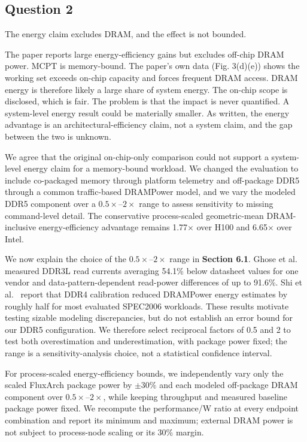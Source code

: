 \subsection{Question 2}
\begin{reviewcomment}
The energy claim excludes DRAM, and the effect is not bounded.

The paper reports large energy-efficiency gains but excludes off-chip DRAM power. MCPT is memory-bound. The paper's own data (Fig. 3(d)(e)) shows the working set exceeds on-chip capacity and forces frequent DRAM access. DRAM energy is therefore likely a large share of system energy. The on-chip scope is disclosed, which is fair. The problem is that the impact is never quantified. A system-level energy result could be materially smaller. As written, the energy advantage is an architectural-efficiency claim, not a system claim, and the gap between the two is unknown.
\end{reviewcomment}
We agree that the original on-chip-only comparison could not support a system-level energy claim for a memory-bound workload. We changed the evaluation to include co-packaged memory through platform telemetry and off-package DDR5 through a common traffic-based DRAMPower model, and we vary the modeled DDR5 component over a $0.5\times$--$2\times$ range to assess sensitivity to missing command-level detail. The conservative process-scaled geometric-mean DRAM-inclusive energy-efficiency advantage remains 1.77$\times$ over H100 and 6.65$\times$ over Intel.

We now explain the choice of the $0.5\times$--$2\times$ range in \textbf{Section 6.1}. Ghose et al.~ measured DDR3L read currents averaging 54.1\% below datasheet values for one vendor and data-pattern-dependent read-power differences of up to 91.6\%. Shi et al.~ report that DDR4 calibration reduced DRAMPower energy estimates by roughly half for most evaluated SPEC2006 workloads. These results motivate testing sizable modeling discrepancies, but do not establish an error bound for our DDR5 configuration. We therefore select reciprocal factors of 0.5 and 2 to test both overestimation and underestimation, with package power fixed; the range is a sensitivity-analysis choice, not a statistical confidence interval.

For process-scaled energy-efficiency bounds, we independently vary only the scaled FluxArch package power by $\pm30\%$ and each modeled off-package DRAM component over $0.5\times$--$2\times$, while keeping throughput and measured baseline package power fixed. We recompute the performance/W ratio at every endpoint combination and report its minimum and maximum; external DRAM power is not subject to process-node scaling or its 30\% margin.


